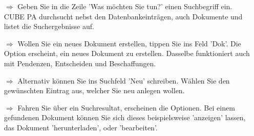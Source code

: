 \documentclass{article}
\begin{document}
\begin{multicols}{2}
\begin{tcolorbox}[colback=blue!5,colframe=blue!40!black,title=Was möchten Sie tun?]
\begin{itemize}
  \item[$\Longrightarrow$] Geben Sie in die Zeile 'Was möchten Sie tun?' einen Suchbegriff ein. CUBE PA durchsucht nebst den Datenbankeinträgen, auch Dokumente und listet die Suchergebnisse auf.
  \item[$\Longrightarrow$] Wollen Sie ein neues Dokument erstellen, tippen Sie ins Feld 'Dok'. Die Option erscheint, ein neues Dokument zu erstellen.  Dasselbe funktioniert auch mit Pendenzen, Entscheiden und Beschaffungen.
	\item[$\Longrightarrow$] Alternativ können Sie ins Suchfeld 'Neu' schreiben. Wählen Sie den gewünschten Eintrag aus, welcher Sie neu anlegen wollen.
	\item[$\Longrightarrow$] Fahren Sie über ein Suchresultat, erscheinen die Optionen. Bei einem gefundenen Dokument können Sie sich dieses beispielsweise 'anzeigen' lassen, das Dokument 'herunterladen', oder 'bearbeiten'. 
\end{itemize}
\end{tcolorbox}


\end{multicols}
\end{document}
